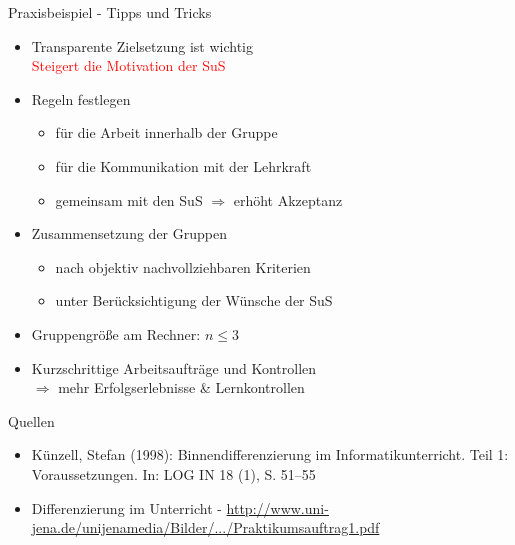 \documentclass{beamer}
\newcommand{\teacher}[1]{\textcolor{red}{#1}}
\newcommand{\ppause}{}
\begin{document}
	\begin{frame}[t]{Praxisbeispiel - Tipps und Tricks}
		\begin{itemize}
			\ppause
			\item Transparente Zielsetzung ist wichtig\\
			\teacher{Steigert die Motivation der SuS}
			\ppause
			
			\item Regeln festlegen
			\ppause
			\begin{itemize}
				\item für die Arbeit innerhalb der Gruppe
				\ppause
				\item für die Kommunikation mit der Lehrkraft
				\ppause
				\item gemeinsam mit den SuS $\Rightarrow$ erhöht Akzeptanz
			\end{itemize}
			
			\ppause
			\item Zusammensetzung der Gruppen
			\ppause
			\begin{itemize}
				\item nach objektiv nachvollziehbaren Kriterien
				\ppause
				\item unter Berücksichtigung der Wünsche der SuS
			\end{itemize}
			
			\ppause
			\item Gruppengröße am Rechner: $n \le 3$
			
			\ppause
			\item Kurzschrittige Arbeitsaufträge und Kontrollen\\
			$\Rightarrow$ mehr Erfolgserlebnisse \& Lernkontrollen
		\end{itemize}
	\end{frame}
	
	\begin{frame}[t]{Quellen}
		\begin{itemize}
			\item Künzell, Stefan (1998): Binnendifferenzierung im Informatikunterricht. Teil 1: Voraussetzungen. In: LOG IN 18 (1), S. 51–55
			\item Differenzierung im Unterricht - \url{http://www.uni-jena.de/unijenamedia/Bilder/.../Praktikumsauftrag1.pdf}
		\end{itemize}
	\end{frame}
	
\end{document}
